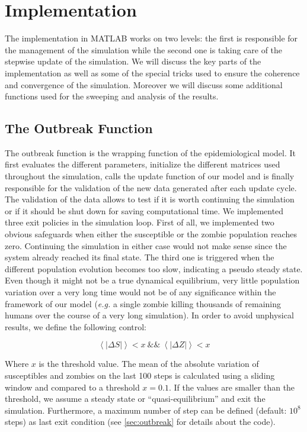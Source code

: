\documentclass[11pt]{article} %
\begin{document}
\section{Implementation}\indent

The implementation in MATLAB works on two levels: the first is responsible for the management of the simulation while the second one is taking care of the stepwise update of the simulation. We will discuss the key parts of the implementation as well as some of the special tricks used to ensure the coherence and convergence of the simulation. Moreover we will discuss some additional functions used for the sweeping and analysis of the results.


\subsection{The Outbreak Function}\indent
\label{outbreakimpl}

The outbreak function is the wrapping function of the epidemiological model. It first evaluates the different parameters, initialize the different matrices used throughout the simulation, calls the update function of our model and is finally responsible for the validation of the new data generated after each update cycle. The validation of the data allows to test if it is worth continuing the simulation or if it should be shut down for saving computational time. We implemented three exit policies in the simulation loop. First of all, we implemented two obvious safeguards when either the susceptible or the zombie population reaches zero. Continuing the simulation in either case would not make sense since the system already reached its final state. The third one is triggered when the different population evolution becomes too slow, indicating a pseudo steady state. Even though it might not be a true dynamical equilibrium, very little population variation over a very long time would not be of any significance within the framework of our model (\textit{e.g.} a single zombie killing thousands of remaining humans over the course of a very long simulation). In order to avoid unphysical results, we define the following control:

\bigskip
\begin{equation} \label{eq:outbreakequilibrium}
\left\langle \left| \Delta S \right| \right\rangle < x\ \&\&\ \left\langle\left|\Delta Z \right| \right\rangle < x
\end{equation}
\bigskip

Where $x$ is the threshold value. The mean of the absolute variation of susceptibles and zombies on the last 100 steps is calculated using a sliding window and compared to a threshold $x = 0.1$. If the values are smaller than the threshold, we assume a steady state or ``quasi-equilibrium'' and exit the simulation. Furthermore, a maximum number of step can be defined (default: $10^8$ steps) as last exit condition (see \ref{sec:outbreak} for details about the code).
\end{document}

